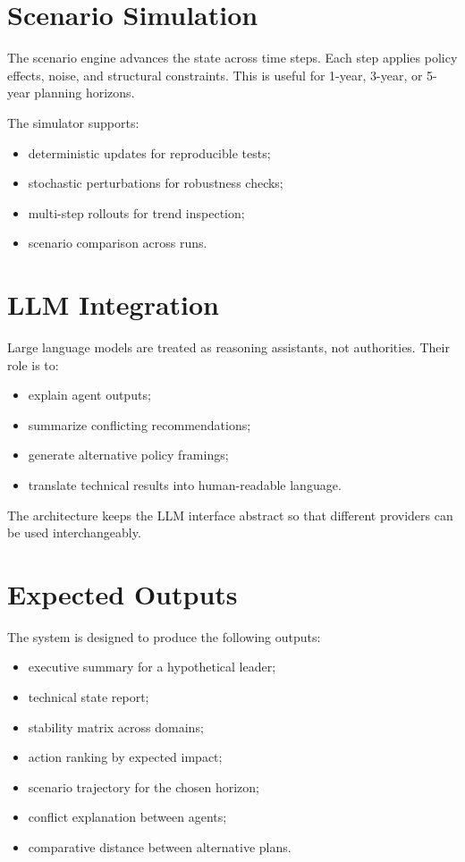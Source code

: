 \documentclass[11pt,a4paper]{article}
\begin{document}
\section{Scenario Simulation}

The scenario engine advances the state across time steps. Each step applies policy effects, noise, and structural constraints. This is useful for 1-year, 3-year, or 5-year planning horizons.

The simulator supports:
\begin{itemize}[leftmargin=1.5em]
    \item deterministic updates for reproducible tests;
    \item stochastic perturbations for robustness checks;
    \item multi-step rollouts for trend inspection;
    \item scenario comparison across runs.
\end{itemize}

\section{LLM Integration}

Large language models are treated as reasoning assistants, not authorities. Their role is to:
\begin{itemize}[leftmargin=1.5em]
    \item explain agent outputs;
    \item summarize conflicting recommendations;
    \item generate alternative policy framings;
    \item translate technical results into human-readable language.
\end{itemize}

The architecture keeps the LLM interface abstract so that different providers can be used interchangeably.

\section{Expected Outputs}

The system is designed to produce the following outputs:

\begin{itemize}[leftmargin=1.5em]
    \item executive summary for a hypothetical leader;
    \item technical state report;
    \item stability matrix across domains;
    \item action ranking by expected impact;
    \item scenario trajectory for the chosen horizon;
    \item conflict explanation between agents;
    \item comparative distance between alternative plans.
\end{itemize}
\end{document}
